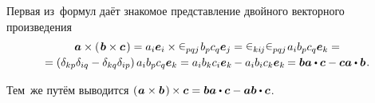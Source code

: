 \begin{otherlanguage}{russian}
Первая из~формул даёт знакомое представление двойного векторного произведения
\[\begin{array}{c}
\bm{a} \times \left(\hspace{0.2ex}{\bm{b} \times \bm{c}}\hspace{0.2ex}\right) = a_i \bm{e}_i \times \levicivita_{pqj} \hspace{.2ex} b_p c_q \bm{e}_j  = \levicivita_{ki\hspace{-0.1ex}j} \levicivita_{pqj} \hspace{.2ex} a_i b_p c_q \bm{e}_k = \\[0.2em]
= \left({\delta_{kp}\delta_{iq} - \delta_{kq}\delta_{ip}}\right) a_i b_p c_q \bm{e}_k = a_i b_k c_i \bm{e}_k \hspace{-0.12ex} - a_i b_i c_k \bm{e}_k \hspace{-0.16ex} = \bm{b}\bm{a} \dotp \bm{c} - \bm{c}\bm{a} \dotp \bm{b} \hspace{.16ex}.
\end{array}\]\vspace{-0.6em}

\noindent Тем~же путём выводится ${\left(\hspace{0.1ex} \bm{a} \times \bm{b} \hspace{0.2ex}\right) \hspace{-0.1ex} \times \bm{c} = \bm{b}\bm{a} \dotp \bm{c} - \bm{a}\bm{b} \dotp \bm{c}}$\hspace{.16ex}.


\end{otherlanguage}
